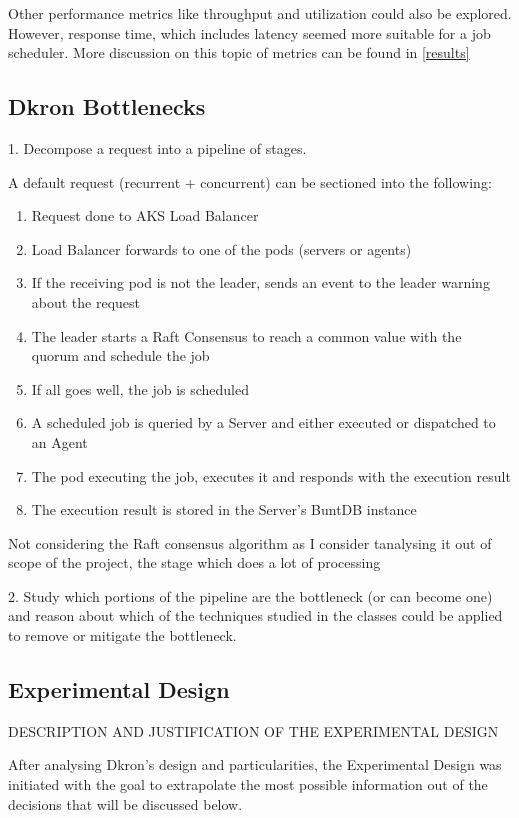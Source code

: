 \documentclass[runningheads]{llncs}
\begin{document}
Other performance metrics like throughput and utilization could also be explored.
However, response time, which includes latency seemed more suitable for a job scheduler.
More discussion on this topic of metrics can be found in \ref{results}


\subsection{Dkron Bottlenecks}
1. Decompose a request into a pipeline of stages.

A default request (recurrent + concurrent) can be sectioned into the following:
\begin{enumerate}
    \item Request done to AKS Load Balancer
    \item Load Balancer forwards to one of the pods (servers or agents)
    \item If the receiving pod is not the leader, sends an event to the leader warning about the request
    \item The leader starts a Raft Consensus to reach a common value with the quorum and schedule the job
    \item If all goes well, the job is scheduled
    \item A scheduled job is queried by a Server and either executed or dispatched to an Agent
    \item The pod executing the job, executes it and responds with the execution result
    \item The execution result is stored in the Server's BuntDB instance
\end{enumerate}

Not considering the Raft consensus algorithm as I consider tanalysing it out of scope of the project,
the stage which does a lot of processing

2. Study which portions of the pipeline are the bottleneck (or can become one) and reason
about which of the techniques studied in the classes could be applied to remove or
mitigate the bottleneck.




\subsection{Experimental Design}
DESCRIPTION AND JUSTIFICATION OF THE EXPERIMENTAL DESIGN

After analysing Dkron's design and particularities, the Experimental Design was initiated with the
goal to extrapolate the most possible information out of the decisions that will be discussed below.
\end{document}
